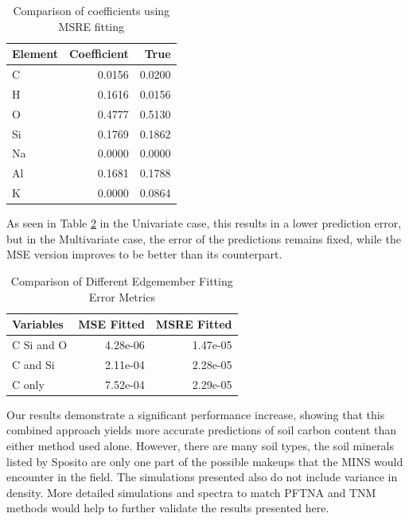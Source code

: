 \documentclass[preprint, 12pt, authoryear]{elsarticle}
\begin{document}
\begin{table}[H]
\centering
\caption{Comparison of coefficients using MSRE fitting}
\label{tab:msre_results}
\begin{tabular}{lrr}
\hline
 Element   &   Coefficient &   True \\
\hline
 C         &       0.0156  &       0.0200  \\
 H         &       0.1616  &       0.0156 \\
 O         &       0.4777  &       0.5130  \\
 Si        &       0.1769  &       0.1862  \\
 Na        &       0.0000  &       0.0000  \\
 Al        &       0.1681  &       0.1788  \\
 K         &       0.0000  &       0.0864 \\
\hline
\end{tabular}
\end{table}

As seen in Table \ref{tab:pred_results_vs_RMSE} in the Univariate case, this results in a lower prediction error, but in the Multivariate case, the error of the predictions remains fixed, while the MSE version improves to be better than its counterpart.

\begin{table}[H]
\centering
\caption{Comparison of Different Edgemember Fitting Error Metrics}
\label{tab:pred_results_vs_RMSE}
\begin{tabular}{lrr}
\toprule
Variables & MSE Fitted & MSRE Fitted \\
\midrule
C Si and O & 4.28e-06 & 1.47e-05 \\
C and Si & 2.11e-04 & 2.28e-05 \\
C only & 7.52e-04 & 2.29e-05 \\
\bottomrule
\end{tabular}
\end{table}

Our results demonstrate a significant performance increase, showing that this combined approach yields more accurate predictions of soil carbon content than either method used alone. However, there are many soil types, the soil minerals listed by Sposito \cite{sposito_chemistry_2008} are only one part of the possible makeups that the MINS would encounter in the field. The simulations presented also do not include variance in density. More detailed simulations and spectra to match PFTNA and TNM methods would help to further validate the results presented here.
\end{document}
